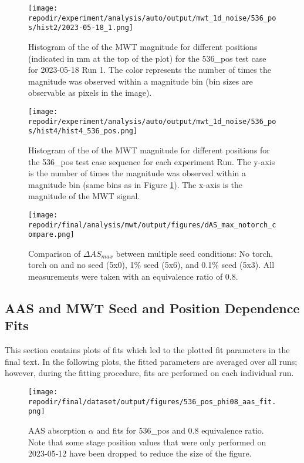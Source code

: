 \begin{figure}
    \centering
    \texttt{[image: \\repodir/experiment/analysis/auto/output/mwt\_1d\_noise/536\_pos/hist2/2023-05-18\_1.png]} 
    \caption{Histogram of the of the MWT magnitude for different positions (indicated in mm at the top of the plot) for the 536\_pos test case for 2023-05-18 Run 1. The color represents the number of times the magnitude was observed within a magnitude bin (bin sizes are observable as pixels in the image). }
    \label{fig:SI_mwt_1d_noise_536_pos_hist2_2023-05-18_1}
\end{figure}

\begin{figure}
    \centering
    \texttt{[image: \\repodir/experiment/analysis/auto/output/mwt\_1d\_noise/536\_pos/hist4/hist4\_536\_pos.png]} 
    \caption{Histogram of the of the MWT magnitude for different positions for the 536\_pos test case sequence for each experiment Run. The y-axis is the number of times the magnitude was observed within a magnitude bin (same bins as in Figure \ref{fig:SI_mwt_1d_noise_536_pos_hist2_2023-05-18_1}). The x-axis is the magnitude of the MWT signal.}
    \label{fig:SI_mwt_1d_noise_536_pos_hist4_hist4_536_pos}
\end{figure}

\begin{figure}[]
\centering
\texttt{[image: \\repodir/final/analysis/mwt/output/figures/dAS\_max\_notorch\_compare.png]}
\caption{Comparison of $\Delta AS_{max}$ between multiple seed conditions: No torch, torch on and no seed (5x0), 1\% seed (5x6), and 0.1\% seed (5x3). All measurements were taken with an equivalence ratio of 0.8.}
\end{figure}


\clearpage
\subsection{AAS and MWT Seed and Position Dependence Fits}

This section contains plots of fits which led to the plotted fit parameters in the final text. In the following plots, the fitted parameters are averaged over all runs; however, during the fitting procedure, fits are performed on each individual run. 

\begin{figure}[]
\centering
\texttt{[image: \\repodir/final/dataset/output/figures/536\_pos\_phi08\_aas\_fit.png]}
\caption{AAS absorption $\alpha$ and fits for 536\_pos and 0.8 equivalence ratio. Note that some stage position values that were only performed on 2023-05-12 have been dropped to reduce the size of the figure. }
\label{fig:SI_536_pos_phi08_aas_fit}
\end{figure}

